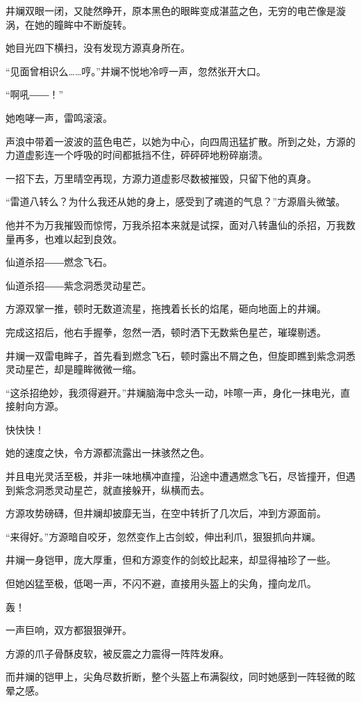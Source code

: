 \begin{this_body}
井斓双眼一闭，又陡然睁开，原本黑色的眼眸变成湛蓝之色，无穷的电芒像是漩涡，在她的瞳眸中不断旋转。

她目光四下横扫，没有发现方源真身所在。

“见面曾相识么……哼。”井斓不悦地冷哼一声，忽然张开大口。

“啊吼――！”

她咆哮一声，雷鸣滚滚。

声浪中带着一波波的蓝色电芒，以她为中心，向四周迅猛扩散。所到之处，方源的力道虚影连一个呼吸的时间都抵挡不住，砰砰砰地粉碎崩溃。

一招下去，万里晴空再现，方源力道虚影尽数被摧毁，只留下他的真身。

“雷道八转么？为什么我还从她的身上，感受到了魂道的气息？”方源眉头微皱。

他并不为万我摧毁而惊愕，万我杀招本来就是试探，面对八转蛊仙的杀招，万我数量再多，也难以起到良效。

仙道杀招――燃念飞石。

仙道杀招――紫念洞悉灵动星芒。

方源双掌一推，顿时无数道流星，拖拽着长长的焰尾，砸向地面上的井斓。

完成这招后，他右手握拳，忽然一洒，顿时洒下无数紫色星芒，璀璨剔透。

井斓一双雷电眸子，首先看到燃念飞石，顿时露出不屑之色，但旋即瞧到紫念洞悉灵动星芒，却是瞳眸微微一缩。

“这杀招绝妙，我须得避开。”井斓脑海中念头一动，咔嚓一声，身化一抹电光，直接射向方源。

快快快！

她的速度之快，令方源都流露出一抹骇然之色。

并且电光灵活至极，并非一味地横冲直撞，沿途中遭遇燃念飞石，尽皆撞开，但遇到紫念洞悉灵动星芒，就直接躲开，纵横而去。

方源攻势磅礴，但井斓却披靡无当，在空中转折了几次后，冲到方源面前。

“来得好。”方源暗自咬牙，忽然变作上古剑蛟，伸出利爪，狠狠抓向井斓。

井斓一身铠甲，庞大厚重，但和方源变作的剑蛟比起来，却显得袖珍了一些。

但她凶猛至极，低喝一声，不闪不避，直接用头盔上的尖角，撞向龙爪。

轰！

一声巨响，双方都狠狠弹开。

方源的爪子骨酥皮软，被反震之力震得一阵阵发麻。

而井斓的铠甲上，尖角尽数折断，整个头盔上布满裂纹，同时她感到一阵轻微的眩晕之感。


\end{this_body}

